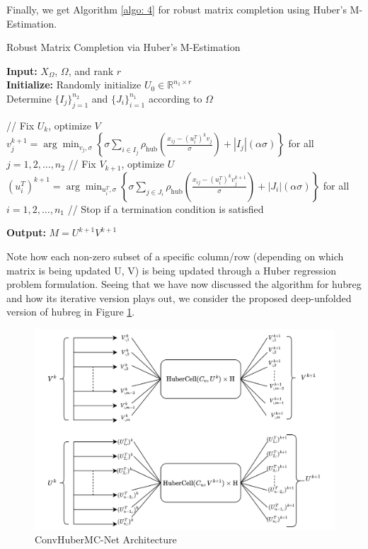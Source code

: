 Finally, we get Algorithm \ref{algo: 4} for robust matrix completion using Huber's M-Estimation.

\begin{algorithm}[H]
    \caption{Robust Matrix Completion via Huber's M-Estimation}
    \textbf{Input:} $X_{\Omega}$, $\Omega$, and rank $r$ \\
    \textbf{Initialize:} Randomly initialize $U_0 \in \mathbb{R}^{n_1 \times r}$ \\
    Determine $\{I_j\}_{j=1}^{n_2}$ and $\{J_i\}_{i=1}^{n_1}$ according to $\Omega$
        \begin{algorithmic}
            \State // Fix $U_k$, optimize $V$
            \State $v^{k+1}_{j} = \arg \min_{v_j, \sigma} \left\{ \sigma \sum_{i \in I_j} \rho_{\text{hub}} \left(\frac{x_{ij} - (u_i^T)^k v_j}{\sigma} \right) + |I_j| (\alpha \sigma) \right\}$ for all $j = 1, 2, \ldots, n_2$
            \State // Fix $V_{k+1}$, optimize $U$
            \State $(u_i^T)^{k+1} = \arg \min_{u_i^T, \sigma} \left\{ \sigma \sum_{j \in J_i} \rho_{\text{hub}} \left( \frac{x_{ij} - (u_i^T)^k v_j^{k+1}}{\sigma} \right) + |J_i| (\alpha \sigma)  \right\}$ for all $i = 1, 2, \ldots, n_1$
            \State // Stop if a termination condition is satisfied
        \EndFor
        \end{algorithmic}
    \textbf{Output:} $M = U^{k+1}V^{k+1}$
    \label{algo: 4}
\end{algorithm}

Note how each non-zero subset of a specific column/row (depending on which matrix is being updated U, V) is being updated through a Huber regression problem formulation. Seeing that we have now discussed the algorithm for hubreg and how its iterative version plays out, we consider the proposed deep-unfolded version of hubreg in Figure \ref{fig: arch1}. 

\begin{figure}[htbp]
  \centering
  \includegraphics[width=\textwidth]{./Figures/huber-mc.png}
  \caption{ConvHuberMC-Net Architecture}
  \label{fig: arch1}
\end{figure}

